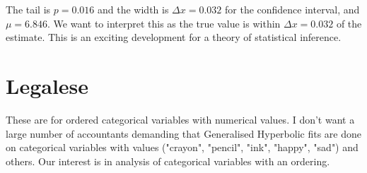 \documentclass{amsart}
\begin{document}
The tail is $p=0.016$ and the width is $\Delta x = 0.032$ for the confidence interval, and $\mu=6.846$.  We want to interpret this as the true value is within $\Delta x = 0.032$ of the estimate.  This is an exciting development for a theory of statistical inference.

\section{Legalese}

These are for ordered categorical variables with numerical values.  I don't want a large number of accountants demanding that Generalised Hyperbolic fits are done on categorical variables with values ("crayon", "pencil", "ink", "happy", "sad") and others.  Our interest is in analysis of categorical variables with an ordering.
\end{document}
